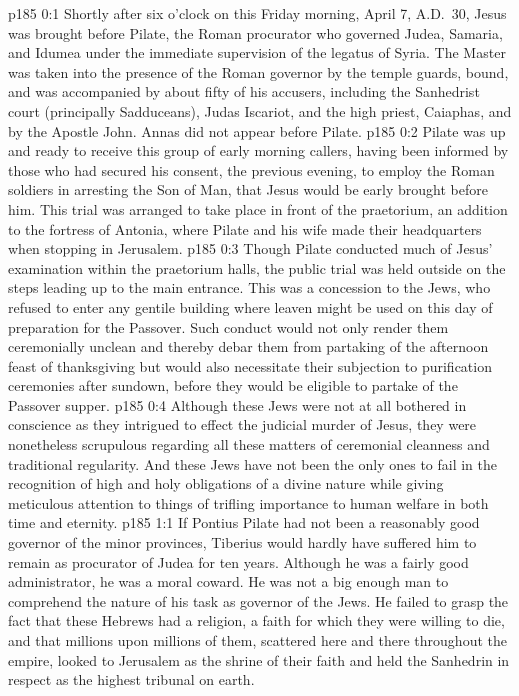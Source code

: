 \author{Midwayer Commission}
\vs p185 0:1 Shortly after six o’clock on this Friday morning, April 7, A.D.~30, Jesus was brought before Pilate, the Roman procurator who governed Judea, Samaria, and Idumea under the immediate supervision of the legatus of Syria. The Master was taken into the presence of the Roman governor by the temple guards, bound, and was accompanied by about fifty of his accusers, including the Sanhedrist court (principally Sadduceans), Judas Iscariot, and the high priest, Caiaphas, and by the Apostle John. Annas did not appear before Pilate.
\vs p185 0:2 Pilate was up and ready to receive this group of early morning callers, having been informed by those who had secured his consent, the previous evening, to employ the Roman soldiers in arresting the Son of Man, that Jesus would be early brought before him. This trial was arranged to take place in front of the praetorium, an addition to the fortress of Antonia, where Pilate and his wife made their headquarters when stopping in Jerusalem.
\vs p185 0:3 Though Pilate conducted much of Jesus’ examination within the praetorium halls, the public trial was held outside on the steps leading up to the main entrance. This was a concession to the Jews, who refused to enter any gentile building where leaven might be used on this day of preparation for the Passover. Such conduct would not only render them ceremonially unclean and thereby debar them from partaking of the afternoon feast of thanksgiving but would also necessitate their subjection to purification ceremonies after sundown, before they would be eligible to partake of the Passover supper.\plusone
\vs p185 0:4 Although these Jews were not at all bothered in conscience as they intrigued to effect the judicial murder of Jesus, they were nonetheless scrupulous regarding all these matters of ceremonial cleanness and traditional regularity. And these Jews have not been the only ones to fail in the recognition of high and holy obligations of a divine nature while giving meticulous attention to things of trifling importance to human welfare in both time and eternity.
\vs p185 1:1 If Pontius Pilate had not been a reasonably good governor of the minor provinces, Tiberius would hardly have suffered him to remain as procurator of Judea for ten years. Although he was a fairly good administrator, he was a moral coward. He was not a big enough man to comprehend the nature of his task as governor of the Jews. He failed to grasp the fact that these Hebrews had a  religion, a faith for which they were willing to die, and that millions upon millions of them, scattered here and there throughout the empire, looked to Jerusalem as the shrine of their faith and held the Sanhedrin in respect as the highest tribunal on earth.
